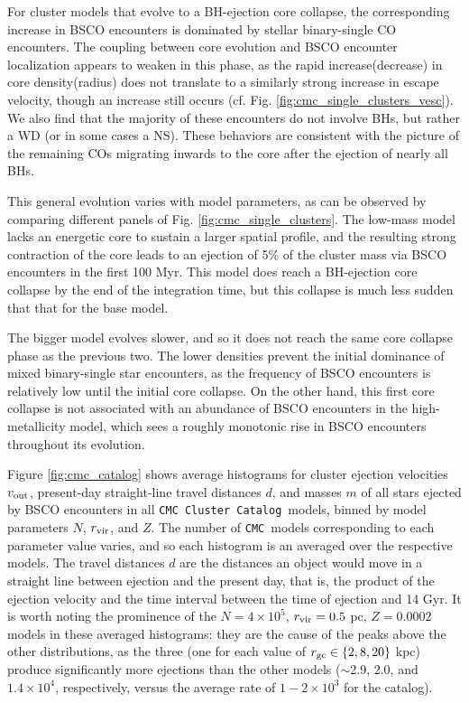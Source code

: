 \documentclass[twocolumn]{aastex631}
\newcommand{\CMC}{\texttt{CMC}}
\newcommand{\CMCcat}{\texttt{CMC Cluster Catalog}}
\begin{document}
For cluster models that evolve to a BH-ejection core collapse, the corresponding increase in BSCO encounters is dominated by stellar binary-single CO encounters.
The coupling between core evolution and BSCO encounter localization appears to weaken in this phase, as the rapid increase(decrease) in core density(radius) does not translate to a similarly strong increase in escape velocity, though an increase still occurs (cf. Fig. \ref{fig:cmc_single_clusters_vesc}).
We also find that the majority of these encounters do not involve BHs, but rather a WD (or in some cases a NS).
These behaviors are consistent with the picture of the remaining COs migrating inwards to the core after the ejection of nearly all BHs.

This general evolution varies with model parameters, as can be observed by comparing different panels of Fig. \ref{fig:cmc_single_clusters}.
The low-mass model lacks an energetic core to sustain a larger spatial profile, and the resulting strong contraction of the core leads to an ejection of 5\% of the cluster mass via BSCO encounters in the first 100 Myr.
This model does reach a BH-ejection core collapse by the end of the integration time, but this collapse is much less sudden that that for the base model.

The bigger model evolves slower, and so it does not reach the same core collapse phase as the previous two.
The lower densities prevent the initial dominance of mixed binary-single star encounters, as the frequency of BSCO encounters is relatively low until the initial core collapse.
On the other hand, this first core collapse is not associated with an abundance of BSCO encounters in the high-metallicity model, which sees a roughly monotonic rise in BSCO encounters throughout its evolution.

Figure \ref{fig:cmc_catalog} shows average histograms for cluster ejection velocities $v_{\rm out}$, present-day straight-line travel distances $d$, and masses $m$ of all stars ejected by BSCO encounters in all \CMCcat\ models, binned by model parameters $N$, $r_{\rm vir}$, and $Z$.
The number of \CMC\ models corresponding to each parameter value varies, and so each histogram is an averaged over the respective models.
The travel distances $d$ are the distances an object would move in a straight line between ejection and the present day, that is, the product of the ejection velocity and the time interval between the time of ejection and 14 Gyr.
It is worth noting the prominence of the $N = 4\times10^5$, $r_{\rm vir} = 0.5$ pc, $Z = 0.0002$ models in these averaged histograms: they are the cause of the peaks above the other distributions, as the three (one for each value of $r_{\rm gc} \in \{2, 8, 20\}$ kpc) produce significantly more ejections than the other models ($\sim$2.9, 2.0, and $1.4 \times 10^4$, respectively, versus the average rate of $1-2 \times 10^3$ for the catalog).
\end{document}
